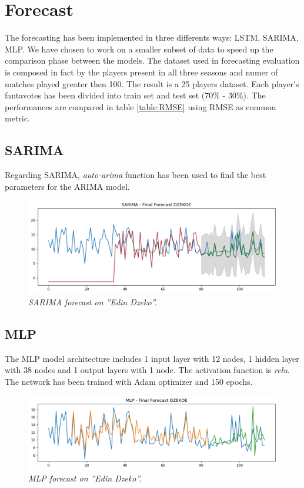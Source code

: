 \chapter {Forecast}

The forecasting has been implemented in three differents ways: LSTM, SARIMA, MLP.
We have chosen to work on a smaller subset of data to speed up the comparison phase between the models.
The dataset used in forecasting evaluation is composed in fact by the players present in all three seasons and numer of matches played greater then 100.
The result is a 25 players dataset. 
Each player's fantavotes has been divided into train set and test set (70\% - 30\%).
The performances are compared in table \ref{table:RMSE} using RMSE as common metric.

\section{SARIMA}

Regarding SARIMA, \textit{auto-arima} function has been used to find the best parameters for the ARIMA model.


\begin{figure}[H]
  \includegraphics[scale=0.5]{images/dzeko_sarima_fantavoti.png}
   \caption{\textit{SARIMA forecast on ''Edin Dzeko''.}}
  \label{fig:sarima}
\end{figure}

\section{MLP}
The MLP model architecture includes 1 input layer with 12 nodes, 1 hidden layer with 38 nodes and 1 output layers with 1 node. The activation function is \textit{relu}.
The network has been trained with Adam optimizer and 150 epochs.

\begin{figure}[H]
  \includegraphics[scale=0.5]{images/dzeko_mlp_fantavoti.png}
   \caption{\textit{MLP forecast on ''Edin Dzeko''.}}
  \label{fig:sarima}
\end{figure}


